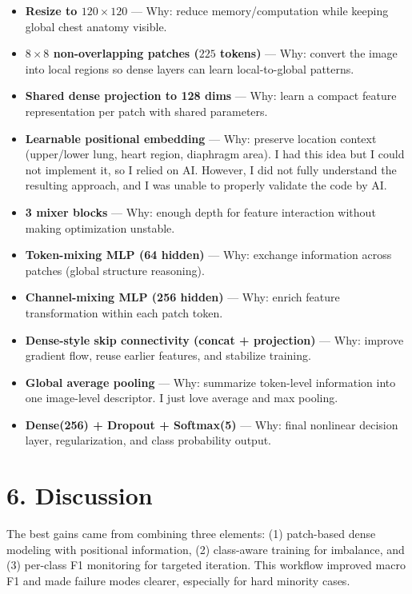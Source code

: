 \documentclass[11pt]{article}
\begin{document}
\begin{itemize}[leftmargin=1.2em]
\item \textbf{Resize to \(120\times120\)} --- {Why:} reduce memory/computation while keeping global chest anatomy visible.
\item \textbf{\(8\times8\) non-overlapping patches (\(225\) tokens)} --- {Why:} convert the image into local regions so dense layers can learn local-to-global patterns.
\item \textbf{Shared dense projection to 128 dims} --- {Why:} learn a compact feature representation per patch with shared parameters.
\item \textbf{Learnable positional embedding} --- {Why:} preserve location context (upper/lower lung, heart region, diaphragm area). I had this idea but I could not implement it, so I relied on AI. However, I did not fully understand the resulting approach, and I was unable to properly validate the code by AI. 
\item \textbf{3 mixer blocks} --- {Why:} enough depth for feature interaction without making optimization unstable.
\item \textbf{Token-mixing MLP (64 hidden)} --- {Why:} exchange information across patches (global structure reasoning).
\item \textbf{Channel-mixing MLP (256 hidden)} --- {Why:} enrich feature transformation within each patch token.
\item \textbf{Dense-style skip connectivity (concat + projection)} --- {Why:} improve gradient flow, reuse earlier features, and stabilize training.
\item \textbf{Global average pooling} --- {Why:} summarize token-level information into one image-level descriptor. I just love average and max pooling. 
\item \textbf{Dense(256) + Dropout + Softmax(5)} --- {Why:} final nonlinear decision layer, regularization, and class probability output.
\end{itemize}

\section*{6. Discussion}
The best gains came from combining three elements: (1) patch-based dense modeling with positional information, (2) class-aware training for imbalance, and (3) per-class F1 monitoring for targeted iteration. This workflow improved macro F1 and made failure modes clearer, especially for hard minority cases. 
\end{document}
